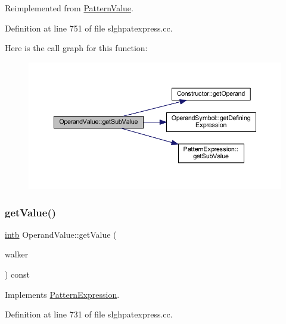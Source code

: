 Reimplemented from \mbox{\hyperlink{class_pattern_value_a2c441de78d7241fc841c4223efe1b8bc}{Pattern\+Value}}.



Definition at line 751 of file slghpatexpress.\+cc.

Here is the call graph for this function\+:
\nopagebreak
\begin{figure}[H]
\begin{center}
\leavevmode
\includegraphics[width=350pt]{class_operand_value_a76d6f76e74edfb71ce1cd126c44a3788_cgraph}
\end{center}
\end{figure}
\mbox{\label{class_operand_value_a5e43ba8332983fb0268dac1ce7903f19}} 
\subsubsection{\texorpdfstring{getValue()}{getValue()}}
{\footnotesize\ttfamily \mbox{\hyperlink{types_8h_aa925ba3e627c2df89d5b1cfe84fb8572}{intb}} Operand\+Value\+::get\+Value (\begin{DoxyParamCaption}\item[{\mbox{\hyperlink{class_parser_walker}{Parser\+Walker}} \&}]{walker }\end{DoxyParamCaption}) const\hspace{0.3cm}{\ttfamily [virtual]}}



Implements \mbox{\hyperlink{class_pattern_expression_a8332c6ea4c5a7e9dfc690df2a6458bb8}{Pattern\+Expression}}.



Definition at line 731 of file slghpatexpress.\+cc.

